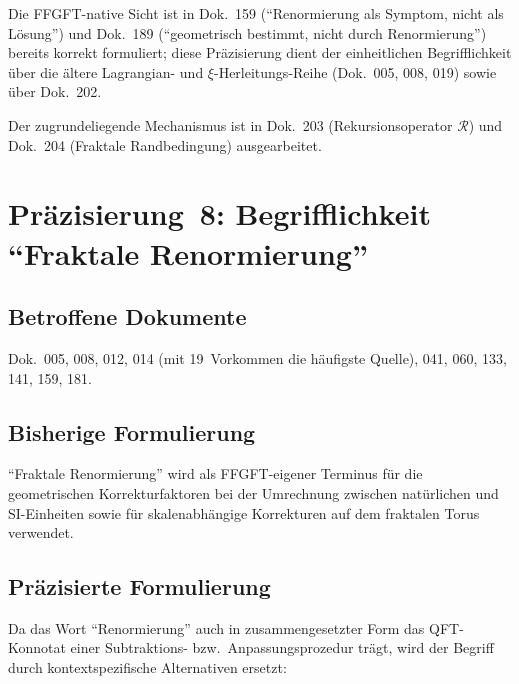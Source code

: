 Die FFGFT-native Sicht ist in Dok.~159 (\enquote{Renormierung als Symptom,
nicht als Lösung}) und Dok.~189 (\enquote{geometrisch bestimmt, nicht durch
Renormierung}) bereits korrekt formuliert; diese Präzisierung dient der
einheitlichen Begrifflichkeit über die ältere Lagrangian- und
$\xi$-Herleitungs-Reihe (Dok.~005, 008, 019) sowie über Dok.~202.

Der zugrundeliegende Mechanismus ist in Dok.~203
(Rekursionsoperator $\mathcal{R}$) und Dok.~204
(Fraktale Randbedingung) ausgearbeitet.

\section{\texorpdfstring{Präzisierung~8: Begrifflichkeit \enquote{Fraktale Renormierung}}{Praezisierung 8: Begrifflichkeit Fraktale Renormierung}}

\subsection*{Betroffene Dokumente}

Dok.~005, 008, 012, 014 (mit 19~Vorkommen die häufigste Quelle),
041, 060, 133, 141, 159, 181.

\subsection*{Bisherige Formulierung}

\enquote{Fraktale Renormierung} wird als FFGFT-eigener Terminus für die
geometrischen Korrekturfaktoren bei der Umrechnung zwischen
natürlichen und SI-Einheiten sowie für skalenabhängige Korrekturen
auf dem fraktalen Torus verwendet.

\subsection*{Präzisierte Formulierung}

Da das Wort \enquote{Renormierung} auch in zusammengesetzter Form
das QFT-Konnotat einer Subtraktions- bzw.\ Anpassungsprozedur trägt,
wird der Begriff durch kontextspezifische Alternativen ersetzt:

